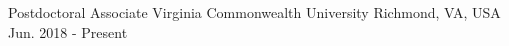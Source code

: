 
\begin{cventries}

  \cventry
    {Postdoctoral Associate} %
    {Virginia Commonwealth University} %
    {Richmond, VA, USA} %
    {Jun. 2018 - Present} %
    {
}
\end{cventries}
